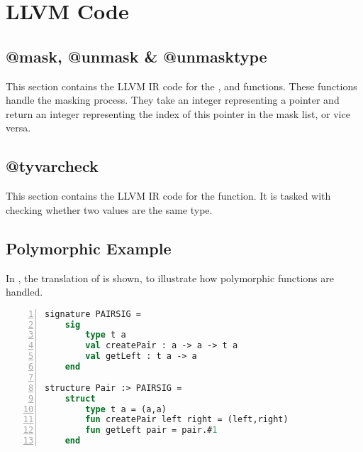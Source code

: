 \chapter{LLVM Code}
\label{app:LLVMCode}
\section{@mask, @unmask \& @unmasktype}
This section contains the LLVM IR code for the ,  and  functions. These functions handle the masking process. They take an integer representing a pointer and return an integer representing the index of this pointer in the mask list, or vice versa. 

\section{@tyvarcheck}
This section contains the LLVM IR code for the  function. It is tasked with checking whether two  values are the same type.

\section{Polymorphic Example}
\label{sec:PolymorphicExample}

In , the \LLVMIR translation of  is shown, to illustrate how polymorphic functions are handled.

\begin{lstlisting}[frame=single, language=ML,numbers=left, label=ml:polymorphic, caption={[Pair structure MiniML]The polymorphic Pair structure.}]
signature PAIRSIG =
    sig 
        type t a
        val createPair : a -> a -> t a
        val getLeft : t a -> a
    end

structure Pair :> PAIRSIG =
    struct
        type t a = (a,a)
        fun createPair left right = (left,right)
        fun getLeft pair = pair.#1
    end
\end{lstlisting}



